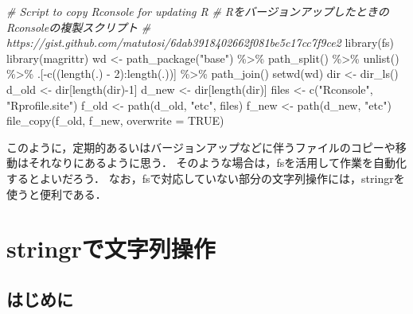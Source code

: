 \documentclass[
]{article}
\newenvironment{Shaded}{\begin{snugshade}}{\end{snugshade}}
\newcommand{\AttributeTok}[1]{\textcolor[rgb]{0.77,0.63,0.00}{#1}}
\newcommand{\CommentTok}[1]{\textcolor[rgb]{0.56,0.35,0.01}{\textit{#1}}}
\newcommand{\ConstantTok}[1]{\textcolor[rgb]{0.00,0.00,0.00}{#1}}
\newcommand{\DecValTok}[1]{\textcolor[rgb]{0.00,0.00,0.81}{#1}}
\newcommand{\FunctionTok}[1]{\textcolor[rgb]{0.00,0.00,0.00}{#1}}
\newcommand{\NormalTok}[1]{#1}
\newcommand{\OtherTok}[1]{\textcolor[rgb]{0.56,0.35,0.01}{#1}}
\newcommand{\SpecialCharTok}[1]{\textcolor[rgb]{0.00,0.00,0.00}{#1}}
\newcommand{\StringTok}[1]{\textcolor[rgb]{0.31,0.60,0.02}{#1}}
\begin{document}
\begin{Shaded}
\begin{Highlighting}[]
  \CommentTok{\# Script to copy Rconsole for updating R}
  \CommentTok{\# RをバージョンアップしたときのRconsoleの複製スクリプト}
  \CommentTok{\#   https://gist.github.com/matutosi/6dab3918402662f081be5c17cc7f9ce2}
\FunctionTok{library}\NormalTok{(fs)}
\FunctionTok{library}\NormalTok{(magrittr)}
\NormalTok{wd }\OtherTok{\textless{}{-}} 
  \FunctionTok{path\_package}\NormalTok{(}\StringTok{"base"}\NormalTok{) }\SpecialCharTok{\%\textgreater{}\%}
  \FunctionTok{path\_split}\NormalTok{() }\SpecialCharTok{\%\textgreater{}\%}
  \FunctionTok{unlist}\NormalTok{() }\SpecialCharTok{\%\textgreater{}\%}
\NormalTok{  .[}\SpecialCharTok{{-}}\FunctionTok{c}\NormalTok{((}\FunctionTok{length}\NormalTok{(.) }\SpecialCharTok{{-}} \DecValTok{2}\NormalTok{)}\SpecialCharTok{:}\FunctionTok{length}\NormalTok{(.))] }\SpecialCharTok{\%\textgreater{}\%}
  \FunctionTok{path\_join}\NormalTok{()  }
\FunctionTok{setwd}\NormalTok{(wd)}
\NormalTok{dir }\OtherTok{\textless{}{-}} \FunctionTok{dir\_ls}\NormalTok{()}
\NormalTok{d\_old }\OtherTok{\textless{}{-}}\NormalTok{ dir[}\FunctionTok{length}\NormalTok{(dir)}\SpecialCharTok{{-}}\DecValTok{1}\NormalTok{]}
\NormalTok{d\_new }\OtherTok{\textless{}{-}}\NormalTok{ dir[}\FunctionTok{length}\NormalTok{(dir)]}
\NormalTok{files }\OtherTok{\textless{}{-}} \FunctionTok{c}\NormalTok{(}\StringTok{"Rconsole"}\NormalTok{, }\StringTok{"Rprofile.site"}\NormalTok{)}
\NormalTok{f\_old }\OtherTok{\textless{}{-}} \FunctionTok{path}\NormalTok{(d\_old, }\StringTok{"etc"}\NormalTok{, files)}
\NormalTok{f\_new }\OtherTok{\textless{}{-}} \FunctionTok{path}\NormalTok{(d\_new, }\StringTok{"etc"}\NormalTok{)}
\FunctionTok{file\_copy}\NormalTok{(f\_old, f\_new, }\AttributeTok{overwrite =} \ConstantTok{TRUE}\NormalTok{)}
\end{Highlighting}
\end{Shaded}

このように，定期的あるいはバージョンアップなどに伴うファイルのコピーや移動はそれなりにあるように思う．
そのような場合は，fsを活用して作業を自動化するとよいだろう．
なお，fsで対応していない部分の文字列操作には，stringrを使うと便利である．

\hypertarget{stringr}{%
\section{stringrで文字列操作}\label{stringr}}

\hypertarget{ux306fux3058ux3081ux306b-2}{%
\subsection{はじめに}\label{ux306fux3058ux3081ux306b-2}}
\end{document}
